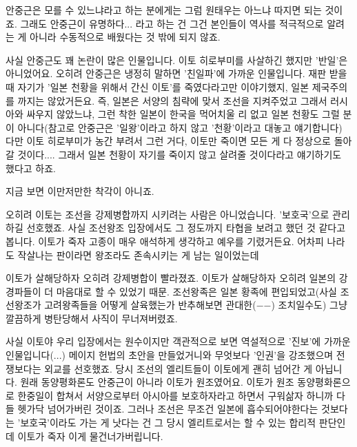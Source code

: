 안중근은 모를 수 있느냐라고 하는 분에게는 그럼 원태우는 아느냐 따지면 되는 것이죠.
그래도 안중근이 유명하다... 라고 하는 건 그건 본인들이 역사를 적극적으로 알려는 게 아니라 수동적으로 배웠다는 것 밖에 되지 않죠.
\vspace{5mm}

사실 안중근도 꽤 논란이 많은 인물입니다. 이토 히로부미를 사살하긴 했지만 '반일'은 아니었어요.
오히려 안중근은 냉정히 말하면 '친일파'에 가까운 인물입니다.
재판 받을 때 자기가 '일본 천황을 위해서 간신 이토'를 죽였다라고만 이야기했지, 일본 제국주의를 까지는 않았거든요.
즉, 일본은 서양의 침략에 맞서 조선을 지켜주었고 그래서 러시아와 싸우지 않았느냐,
그런 착한 일본이 한국을 먹어치울 리 없고 일본 천황도 그럴 분이 아니다(참고로 안중근은 '일왕'이라고 하지 않고 '천황'이라고 대놓고 얘기합니다)
다만 이토 히로부미가 농간 부려서 그런 거다, 이토만 죽이면 모든 게 다 정상으로 돌아갈 것이다....
그래서 일본 천황이 자기를 죽이지 않고 살려줄 것이다라고 얘기하기도 했다고 하죠.
\vspace{5mm}

지금 보면 이만저만한 착각이 아니죠.
\vspace{5mm}

오히려 이토는 조선을 강제병합까지 시키려는 사람은 아니었습니다. '보호국'으로 관리하길 선호했죠.
사실 조선왕조 입장에서도 그 정도까지 타협을 보려고 했던 것 같다고 봅니다. 이토가 죽자 고종이 매우 애석하게 생각하고 예우를 기렸거든요.
어차피 나라도 작살나는 판이라면 왕조라도 존속시키는 게 남는 일이었는데
\vspace{5mm}

이토가 살해당하자 오히려 강제병합이 빨라졌죠. 이토가 살해당하자 오히려 일본의 강경파들이 더 마음대로 할 수 있었기 때문.
조선왕족은 일본 황족에 편입되었고(사실 조선왕조가 고려왕족들을 어떻게 살육했는가 반추해보면 관대한($-$$-$) 조치일수도)
그냥 깔끔하게 병탄당해서 사직이 무너져버렸죠.
\vspace{5mm}

사실 이토야 우리 입장에서는 원수이지만 객관적으로 보면 역설적으로 '진보'에 가까운 인물입니다(...)
메이지 헌법의 초안을 만들었거니와 무엇보다 '인권'을 강조했으며 전쟁보다는 외교를 선호했죠.
당시 조선의 엘리트들이 이토에게 괜히 넘어간 게 아닙니다. 원래 동양평화론도 안중근이 아니라 이토가 원조였어요.
이토가 원조 동양평화론으로 한중일이 합쳐서 서양으로부터 아시아를 보호하자라고 하면서 구워삶자 하니까 다들 헷가닥 넘어가버린 것이죠.
그러나 조선은 무조건 일본에 흡수되어야한다는 것보다는 '보호국'이라도 가는 게 낫다는 건 그 당시 엘리트로서는 할 수 있는 합리적 판단인데
이토가 죽자 이게 물건너가버립니다.
\vspace{5mm}

